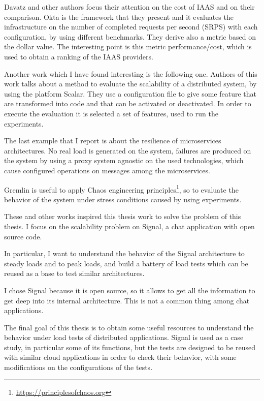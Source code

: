 Davatz and other authors\cite{davatz2017approach} focus their attention on the cost of IAAS and on their comparison.
Okta is the framework that they present and it evaluates the infrastructure on the number of completed requests per second (SRPS) with each configuration, by using different benchmarks.
They derive also a metric based on the dollar value.
The interesting point is this metric performance/cost, which is used to obtain a ranking of the IAAS providers.

Another work which I have found interesting is the following one\cite{preuveneers2016systematic}. Authors of this work talks about a method to evaluate the scalability of a distributed system, by using the platform Scalar. They use a configuration file to give some feature that are transformed into code and that can be activated or deactivated.
In order to execute the evaluation it is selected a set of features, used to run the experiments.

The last example that I report is about the resilience of microservices architectures\cite{heorhiadi2016gremlin}.
No real load is generated on the system, failures are produced on the system by using a proxy system agnostic on the used technologies, which cause configured operations on messages among the microservices.

Gremlin is useful to apply Chaos engineering principles\footnote{\url{https://principlesofchaos.org}}, so to evaluate the behavior of the system under stress conditions caused by using experiments.

These and other works inspired this thesis work to solve the problem of this thesis. I focus on the scalability problem on Signal, a chat application with open source code.

In particular, I want to understand the behavior of the Signal architecture to steady loads and to peak loads, and build a battery of load tests which can be reused as a base to test similar architectures.

I chose Signal because it is open source, so it allows to get all the information to get deep into its internal architecture. This is not a common thing among chat applications.

The final goal of this thesis is to obtain some useful resources to understand the behavior under load tests of distributed applications.
Signal is used as a case study, in particular some of its functions, but the tests are designed to be reused with similar cloud applications in order to check their behavior, with some modifications on the configurations of the tests.

